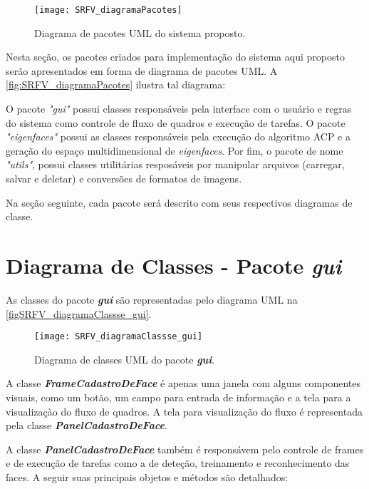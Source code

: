 \begin{figure}[h]
	\centering
	\texttt{[image: SRFV\_diagramaPacotes]}
	\caption{Diagrama de pacotes UML do sistema proposto.}
	\label{fig:SRFV_diagramaPacotes}
\end{figure}

Nesta seção, os pacotes criados para implementação do sistema aqui proposto serão apresentados em forma de diagrama de pacotes UML. A \autoref{fig:SRFV_diagramaPacotes} ilustra tal diagrama:


O pacote \textit{"gui"} possui classes responsáveis pela interface com o usuário e regras do sistema como controle de fluxo de quadros e execução de tarefas. O pacote \textit{"eigenfaces"} possui as classes responsáveis pela execução do algoritmo ACP e a geração do espaço multidimensional de \textit{eigenfaces}. Por fim, o pacote de nome \textit{"utils"}, possui classes utilitárias resposáveis por manipular arquivos (carregar, salvar e deletar) e conversões de formatos de imagens. 

Na seção seguinte, cada pacote será descrito com seus respectivos diagramas de classe.

\section{Diagrama de Classes - Pacote \textit{\textbf{gui}}}\label{sec:diagclasses}
As classes do pacote \textbf{\textit{gui}} são representadas pelo diagrama UML na \autoref{figSRFV_diagramaClassse_gui}.

\begin{figure}[h]
	\centering
	\texttt{[image: SRFV\_diagramaClassse\_gui]}
	\caption{Diagrama de classes UML do pacote \textbf{\textit{gui}}.}
	\label{figSRFV_diagramaClassse_gui}
\end{figure}

A classe \textbf{\textit{FrameCadastroDeFace}} é apenas uma janela com alguns componentes visuais, como um botão, um campo para entrada de informação e a tela para a visualizaçào do fluxo de quadros. A tela para visualização do fluxo é representada pela classe \textbf{\textit{PanelCadastroDeFace}}.

A classe \textbf{\textit{PanelCadastroDeFace}} também é responsávem pelo controle de frames e de execução de tarefas como a de deteção, treinamento e reconhecimento das faces. A seguir suas principais objetos e métodos são detalhados:

